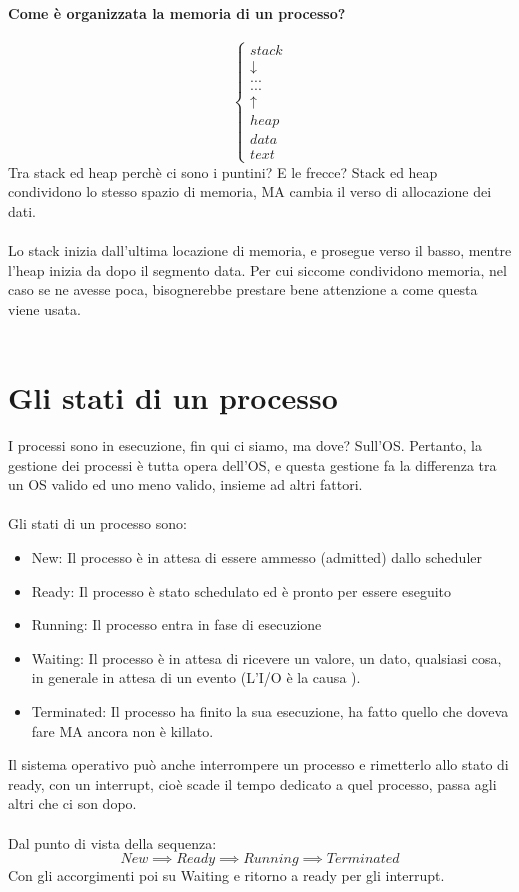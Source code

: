 \documentclass[12pt, a4paper, openany, twoside]{book}
\begin{document}
\paragraph{Come è organizzata la memoria di un processo?}
\[
\begin{cases}
stack \\
\downarrow \\
... \\
... \\
\uparrow \\
heap \\
data \\
text
\end{cases}
\]
Tra stack ed heap perchè ci sono i puntini? E le frecce? Stack ed heap 
condividono lo stesso spazio di memoria, MA cambia il verso di allocazione
dei dati. \\ \\
Lo stack inizia dall'ultima locazione di memoria, e prosegue verso il basso,
mentre l'heap inizia da dopo il segmento data. Per cui siccome condividono
memoria, nel caso se ne avesse poca, bisognerebbe prestare bene attenzione
a come questa viene usata. \\ \\
\section{Gli stati di un processo}
I processi sono in esecuzione, fin qui ci siamo, ma dove? Sull'OS. Pertanto,
la gestione dei processi è tutta opera dell'OS, e questa gestione fa la 
differenza tra un OS valido ed uno meno valido, insieme ad altri fattori.\\ 
\\
Gli stati di un processo sono:
\begin{itemize}
	\item New: Il processo è in attesa di essere ammesso (admitted) dallo
	scheduler
	\item Ready: Il processo è stato schedulato ed è pronto per essere 
	eseguito 
	\item Running: Il processo entra in fase di esecuzione
	\item Waiting: Il processo è in attesa di ricevere un valore, un dato, 
	qualsiasi cosa, in generale in attesa di un evento (L'I/O è la causa
	).
	\item Terminated: Il processo ha finito la sua esecuzione, ha fatto 
	quello che doveva fare MA ancora non è killato.
\end{itemize}
Il sistema operativo può anche interrompere un processo e rimetterlo allo stato
di ready, con un interrupt, cioè scade il tempo dedicato a quel processo, passa
agli altri che ci son dopo.
\\ \\
Dal punto di vista della sequenza: \\
$$New \implies Ready \implies Running \implies Terminated$$
Con gli accorgimenti poi su Waiting e ritorno a ready per gli interrupt. 
\end{document}
